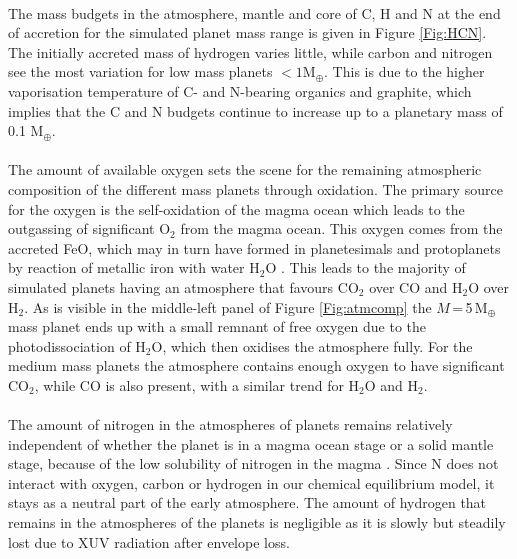 \documentclass[bibyear,tradiabstract]{aa}
\begin{document}
\\
The mass budgets in the atmosphere, mantle and core of C, H and N at the end of accretion for the simulated planet mass range is given in Figure \ref{Fig:HCN}. The initially accreted mass of hydrogen varies little, while carbon and nitrogen see the most variation for low mass planets $<1$M$_{\oplus}$. This is due to the higher vaporisation temperature of C- and N-bearing organics and graphite, which implies that the C and N budgets continue to increase up to a planetary mass of 0.1 M$_{\oplus}$.\\
\\
The amount of available oxygen sets the scene for the remaining atmospheric composition of the different mass planets through oxidation. The primary source for the oxygen is the self-oxidation of the magma ocean which leads to the outgassing of significant O$_2$ from the magma ocean. This oxygen comes from the accreted FeO, which may in turn have formed in planetesimals and protoplanets by reaction of metallic iron with water H$_2$O \citep{Johansen+2023I}. This leads to the majority of simulated planets having an atmosphere that favours CO$_2$ over CO and H$_2$O over H$_2$. As is visible in the middle-left panel of Figure \ref{Fig:atmcomp} the $M$\,=\,5\,M$_{\oplus}$ mass planet ends up with a small remnant of free oxygen due to the photodissociation of H$_2$O, which then oxidises the atmosphere fully. For the medium mass planets the atmosphere contains enough oxygen to have significant CO$_2$, while CO is also present, with a similar trend for H$_2$O and H$_2$. \\
\\
The amount of nitrogen in the atmospheres of planets remains relatively independent of whether the planet is in a magma ocean stage or a solid mantle stage, because of the low solubility of nitrogen in the magma \citep{Sossi+2020}. Since N does not interact with oxygen, carbon or hydrogen in our chemical equilibrium model, it stays as a neutral part of the early atmosphere. The amount of hydrogen that remains in the atmospheres of the planets is negligible as it is slowly but steadily lost due to XUV radiation after envelope loss.
\end{document}
